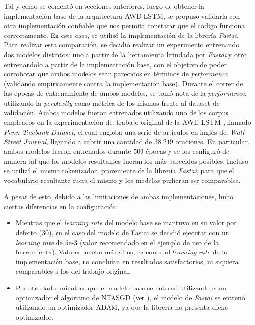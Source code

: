 Tal y como se comentó en secciones anteriores, luego de obtener la implementación base 
de la arquitectura AWD-LSTM, se propuso validarla con otra implementación confiable que 
nos permita constatar que el código funciona correctamente. En este caso, se utilizó la 
implementación de la librería \textit{Fastai}.
Para realizar esta comparación, se decidió realizar un experimento entrenando dos 
modelos distintos: uno a partir de la herramienta brindada por \textit{Fastai} y otro 
entrenandolo a partir de la implementación base, con el objetivo de poder corroborar 
que ambos modelos sean parecidos en términos de \textit{performance} (validando empíricamente 
contra la implementación base). Durante el correr de las épocas de entrenamiento de ambos 
modelos, se tomó nota de la \textit{performance}, utilizando la \textit{perplexity} como métrica de los 
mismos frente al dataset de validación. Ambos modelos fueron entrenados utilizando 
uno de los corpus empleados en la experimentación del trabajo original de la AWD-LSTM 
\parencite{merity2017regularizingoptimizinglstmlanguage}, llamado \textit{Penn Treebank Dataset}, el cual engloba una serie de 
artículos en inglés del \textit{Wall Street Journal}, llegando a cubrir una 
cantidad de $38.219$ oraciones.
En particular, ambos modelos fueron entrenados durante $500$ épocas y se los configuró 
de manera tal que los modelos resultantes fueran los más parecidos posibles. Incluso se utilizó el mismo tokenizador, proveniente de la librería \textit{Fastai}, para que el vocabulario 
resultante fuera el mismo y los modelos pudieran ser comparables.

A pesar de esto, debido a las limitaciones de ambas implementaciones, hubo ciertas 
diferencias en la configuración:

\begin{itemize}
    \item Mientras que el \textit{learning rate} del modelo base se mantuvo en su valor por defecto 
    ($30$), en el caso del modelo de Fastai se decidió ejecutar con un \textit{learning rate} 
    de $5\text{e-}3$ (valor recomendado en el ejemplo de uso de la herramienta). Valores mucho más 
    altos, cercanos al \textit{learning rate} de la implementación base, no concluían en resultados 
    satisfactorios, ni siquiera comparables a los del trabajo original.
    \item Por otro lado, mientras que el modelo base se entrenó utilizando como optimizador 
    el algoritmo de NTASGD (ver \textcite{merity2017regularizingoptimizinglstmlanguage}), el modelo de 
    \textit{Fastai} se entrenó utilizando un optimizador ADAM, ya que la librería no presenta 
    dicho optimizador.
\end{itemize}

